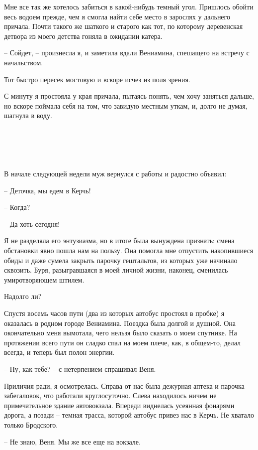 \documentclass[
]{book}
\begin{document}
Мне все так же хотелось забиться в какой-нибудь темный угол. Пришлось обойти весь водоем прежде, чем я смогла найти себе место в зарослях у дальнего причала. Почти такого же шаткого и старого как тот, по которому деревенская детвора из моего детства гоняла в ожидании катера.

-- Сойдет, -- произнесла я, и заметила вдали Вениамина, спешащего на встречу с начальством.

Тот быстро пересек мостовую и вскоре исчез из поля зрения.

С минуту я простояла у края причала, пытаясь понять, чем хочу заняться дальше, но вскоре поймала себя на том, что завидую местным уткам, и, долго не думая, шагнула в воду.

\hypertarget{chapter-62}{%
\chapter{~}\label{chapter-62}}

В начале следующей недели муж вернулся с работы и радостно объявил:

-- Деточка, мы едем в Керчь!

-- Когда?

-- Да хоть сегодня!

Я не разделяла его энтузиазма, но в итоге была вынуждена признать: смена обстановки явно пошла нам на пользу. Она помогла мне отпустить накопившиеся обиды и даже сумела закрыть парочку гештальтов, из которых уже начинало сквозить. Буря, разыгравшаяся в моей личной жизни, наконец, сменилась умиротворяющем штилем.

Надолго ли?

Спустя восемь часов пути (два из которых автобус простоял в пробке) я оказалась в родном городе Вениамина. Поездка была долгой и душной. Она окончательно меня вымотала, чего нельзя было сказать о моем спутнике. На протяжении всего пути он сладко спал на моем плече, как, в общем-то, делал всегда, и теперь был полон энергии.

-- Ну, как тебе? -- с нетерпением спрашивал Веня.

Приличия ради, я осмотрелась. Справа от нас была дежурная аптека и парочка забегаловок, что работали круглосуточно. Слева находилось ничем не примечательное здание автовокзала. Впереди виднелась усеянная фонарями дорога, а позади -- темная трасса, которой автобус привез нас в Керчь. Не хватало только Бродского.

-- Не знаю, Веня. Мы же все еще на вокзале.
\end{document}
